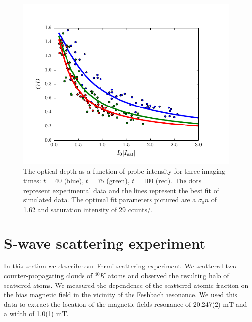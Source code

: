 \documentclass[12pt]{iopart}
\begin{document}
\begin{figure}
	\includegraphics{figure8.pdf}
\caption{The optical depth as a function of probe intensity for three imaging times: $t=40$\us{} (blue),  $t=75$\us{} (green),  $t=100$\us{} (red). The dots represent experimental data and the lines represent the best fit of simulated data. The optimal fit parameters pictured are a $\sigma_0 n$ of 1.62 and saturation intensity of 29 counts/\us{}. }  
\label{fig:isatCalib}
\end{figure}


\section{S-wave scattering experiment}
In this section we describe our Fermi scattering experiment. We scattered two counter-propagating clouds of $^{40}K$ atoms and observed the resulting \swave halo of scattered atoms.  We measured the dependence of the scattered atomic fraction on the bias magnetic field in the vicinity of the Feshbach resonance. We used this data to extract the location of the magnetic fields resonance of 20.247(2) mT and a width of 1.0(1) mT.
\end{document}

